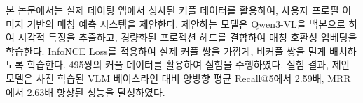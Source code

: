 본 논문에서는 실제 데이팅 앱에서 성사된 커플 데이터를 활용하여, 사용자 프로필 이미지 기반의 매칭 예측 시스템을 제안한다. 제안하는 모델은 Qwen3-VL을 백본으로 하여 시각적 특징을 추출하고, 경량화된 프로젝션 헤드를 결합하여 매칭 호환성 임베딩을 학습한다. InfoNCE Loss를 적용하여 실제 커플 쌍을 가깝게, 비커플 쌍을 멀게 배치하도록 학습한다. 495쌍의 커플 데이터를 활용하여 실험을 수행하였다. 실험 결과, 제안 모델은 사전 학습된 VLM 베이스라인 대비 양방향 평균 Recall@5에서 2.59배, MRR에서 2.63배 향상된 성능을 달성하였다.
